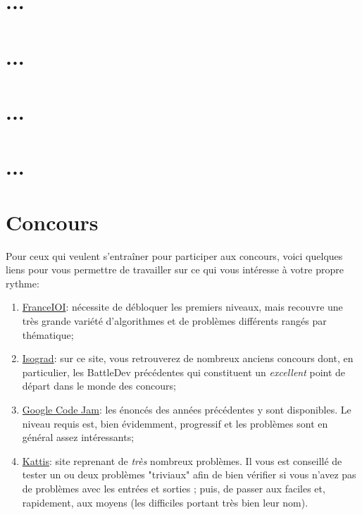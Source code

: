 \documentclass[a4paper]{article}
\begin{document}
\section{...}





\section{...}





\section{...}



\section{...}


\section{Concours}
Pour ceux qui veulent s'entraîner pour participer aux concours, voici quelques liens pour vous permettre de travailler sur ce qui vous intéresse à votre propre rythme:\\
\begin{enumerate}
\item \href{http://www.france-ioi.org/algo/chapters.php}{FranceIOI}: nécessite de débloquer les premiers niveaux, mais recouvre une très grande variété d'algorithmes et de problèmes différents rangés par thématique;
\item \href{https://www.isograd.com/FR/solutionconcours.php?contest_id=46&que_str_id=&reg_typ_id=2&fbclid=IwAR3A3eAVzJVquecv1_MaLoWCMhLxku8SxbQl_awOcJcDevuJQ2HZtNHmupg}{Isograd}: sur ce site, vous retrouverez de nombreux anciens concours dont, en particulier, les BattleDev précédentes qui constituent un \emph{excellent} point de départ dans le monde des concours;
\item \href{https://codingcompetitions.withgoogle.com/codejam?fbclid=IwAR1gU6uObu-gYzAOAdsR4uvmBvfhImyiSUi1pMxEEXkPVFA6MTnWVZ1etT0}{Google Code Jam}: les énoncés des années précédentes y sont disponibles. Le niveau requis est, bien évidemment, progressif et les problèmes sont en général assez intéressants;
\item \href{https://open.kattis.com/}{Kattis}: site reprenant de \emph{très} nombreux problèmes. Il vous est conseillé de tester un ou deux problèmes "triviaux" afin de bien vérifier si vous n'avez pas de problèmes avec les entrées et sorties ; puis, de passer aux faciles et, rapidement, aux moyens (les difficiles portant très bien leur nom).
\end{enumerate}
\end{document}
